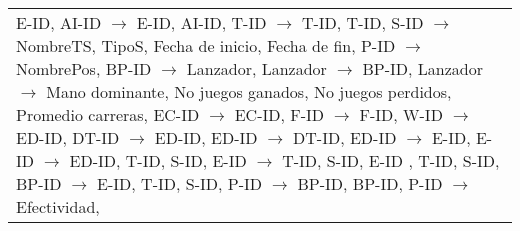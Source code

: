 \documentclass{report}
\begin{document}
\begin{tabularx}{\textwidth}{|X|}
        \hspace*{0.9cm} E-ID, AI-ID $\rightarrow$ E-ID, AI-ID, \newline
        \hspace*{0.9cm} T-ID $\rightarrow$ T-ID, \newline
        \hspace*{0.9cm} T-ID, S-ID $\rightarrow$ NombreTS, TipoS, Fecha de inicio, Fecha de fin, \newline
        \hspace*{0.9cm} P-ID $\rightarrow$ NombrePos, \newline
        \hspace*{0.9cm} BP-ID $\rightarrow$ Lanzador, \newline
        \hspace*{0.9cm} Lanzador $\rightarrow$ BP-ID, \newline
        \hspace*{0.9cm} Lanzador $\rightarrow$ Mano dominante, No juegos ganados, No juegos perdidos, Promedio carreras, \newline
        \hspace*{0.9cm} EC-ID $\rightarrow$ EC-ID, \newline
        \hspace*{0.9cm} F-ID $\rightarrow$ F-ID, \newline
        \hspace*{0.9cm} W-ID $\rightarrow$ ED-ID,  \newline
        \hspace*{0.9cm} DT-ID $\rightarrow$ ED-ID, \newline
        \hspace*{0.9cm} ED-ID $\rightarrow$ DT-ID, \newline
        \hspace*{0.9cm} ED-ID $\rightarrow$ E-ID,  \newline
        \hspace*{0.9cm} E-ID $\rightarrow$ ED-ID, \newline
        \hspace*{0.9cm} T-ID, S-ID, E-ID $\rightarrow$ T-ID, S-ID, E-ID , \newline
        \hspace*{0.9cm} T-ID, S-ID, BP-ID $\rightarrow$ E-ID, \newline
        \hspace*{0.9cm} T-ID, S-ID, P-ID $\rightarrow$ BP-ID, \newline
        \hspace*{0.9cm} BP-ID, P-ID $\rightarrow$ Efectividad, \newline

\end{tabularx}
\end{document}
